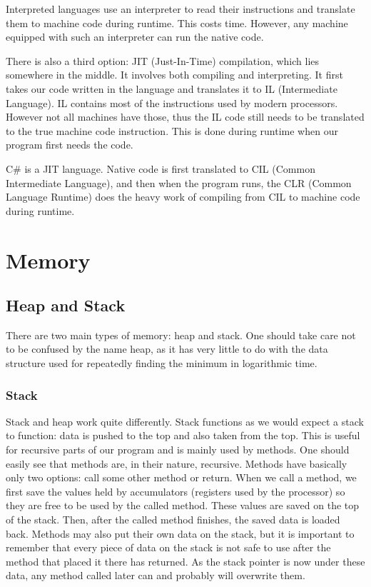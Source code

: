 Interpreted languages use an interpreter to read their instructions and translate them to machine code during runtime. This costs time. However, any machine equipped with such an interpreter can run the native code.

There is also a third option: JIT (Just-In-Time) compilation, which lies somewhere in the middle. It involves both compiling and interpreting. It first takes our code written in the language and translates it to IL (Intermediate Language). IL contains most of the instructions used by modern processors. However not all machines have those, thus the IL code still needs to be translated to the true machine code instruction.
This is done during runtime when our program first needs the code. 

C\# is a JIT language. Native code is first translated to CIL (Common Intermediate Language), and then when the program runs, the CLR (Common Language Runtime) does the heavy work of compiling from CIL to machine code during runtime.

\section{Memory}
\subsection{Heap and Stack}
There are two main types of memory: heap and stack. One should take care not to be confused by the name heap, as it has very little to do with the data structure used for repeatedly finding the minimum in logarithmic time.

\subsubsection{Stack}
Stack and heap work quite differently. Stack functions as we would expect a stack to function: data is pushed to the top and also taken from the top. This is useful for recursive parts of our program and is mainly used by methods. One should easily see that methods are, in their nature, recursive. Methods have basically only two options: call some other method or return. When we call a method, we first save the values held by accumulators (registers used by the processor) so they are free to be used by the called method. These values are saved on the top of the stack. Then, after the called method finishes, the saved data is loaded back. Methods may also put their own data on the stack, but it is important to remember that every piece of data on the stack is not safe to use after the method that placed it there has returned. As the stack pointer is now under these data, any method called later can and probably will overwrite them.


